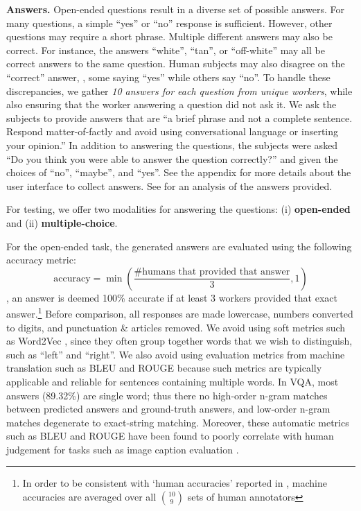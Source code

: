 \textbf{Answers.}
Open-ended questions result in a diverse set of possible answers.
For many questions, a simple ``yes'' or ``no'' response is sufficient. However, other questions
may require a short phrase. Multiple different answers may also be correct. For instance, the
answers ``white'', ``tan'', or ``off-white'' may all be correct answers to the same question.
Human subjects may also disagree on the ``correct'' answer, \eg, some saying ``yes'' while
others say ``no''. To handle these discrepancies, we gather \emph{10 answers for each
question from unique workers}, while also ensuring that the worker answering a question did not ask it.
We ask the subjects to provide answers that are ``a brief phrase and not a complete sentence.
Respond matter-of-factly and avoid using conversational language or inserting your opinion.''
In addition to answering the questions, the subjects were asked ``Do you think you were
able to answer the question correctly?'' and given the choices of ``no'', ``maybe'', and ``yes''. See the appendix for more details about the user interface to collect answers.
See  for an analysis of the answers provided.

For testing, we offer two modalities for answering the questions: (i) \textbf{open-ended} and (ii) \textbf{multiple-choice}.

For the open-ended task, the generated answers are evaluated %
using the following accuracy metric:
\begin{equation*}
\text{accuracy} = \min(\frac{\text{\# humans that provided that answer}}{3},1)
\end{equation*}
\ie, an answer is deemed 100\% accurate if at least 3 workers provided that exact answer.\footnote{In order 
to be consistent with `human accuracies' reported in , machine accuracies are  
averaged over all ${10 \choose 9}$ sets of human annotators}
Before comparison, all responses are made lowercase, numbers converted to digits,
and punctuation \& articles removed. We avoid using soft metrics
such as Word2Vec \cite{word2vec}, since they often group together 
words that we wish to distinguish, such as ``left'' and ``right''. We also avoid using evaluation metrics from machine translation such as BLEU and ROUGE because such metrics are typically applicable and reliable for sentences containing multiple words. In VQA, most answers (89.32\%) are single word; thus there no high-order n-gram matches between predicted answers and ground-truth answers, and low-order n-gram matches degenerate to exact-string matching. Moreover, these automatic metrics such as BLEU and ROUGE have been found to poorly correlate with human judgement for tasks such as image caption evaluation \cite{DBLP:journals/corr/ChenFLVGDZ15}.

